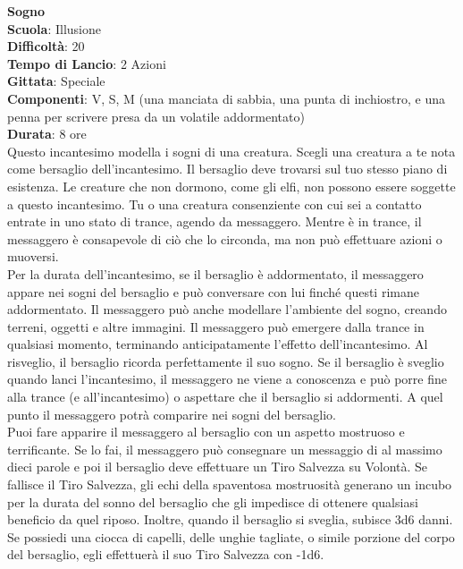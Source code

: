 \begin{multicols}{2}
\medskip\textbf{Sogno}\\
\textbf{Scuola}: Illusione\\
\textbf{Difficoltà}:  20\\
\textbf{Tempo di Lancio}: 2 Azioni\\
\textbf{Gittata}: Speciale\\
\textbf{Componenti}: V, S, M (una manciata di sabbia, una punta di inchiostro, e una penna per scrivere presa da un volatile addormentato)\\
\textbf{Durata}: 8 ore\\
Questo incantesimo modella i sogni di una creatura. Scegli una creatura a te nota come bersaglio dell'incantesimo. Il bersaglio deve trovarsi sul tuo stesso piano di esistenza. Le creature che non dormono, come gli elfi, non possono essere soggette a questo incantesimo. Tu o una creatura consenziente con cui sei a contatto entrate in uno stato di trance, agendo da messaggero. Mentre è in trance, il messaggero è consapevole di ciò che lo circonda, ma non può effettuare azioni o muoversi.\\
Per la durata dell'incantesimo, se il bersaglio è addormentato, il messaggero appare nei sogni del bersaglio e può conversare con lui finché questi rimane addormentato. Il messaggero può anche modellare l’ambiente del sogno, creando terreni, oggetti e altre immagini. Il messaggero può emergere dalla trance in qualsiasi momento, terminando anticipatamente l’effetto dell'incantesimo. Al risveglio, il bersaglio ricorda perfettamente il suo sogno. Se il bersaglio è sveglio quando lanci l'incantesimo, il messaggero ne viene a conoscenza e può porre fine alla trance (e all'incantesimo) o aspettare che il bersaglio si addormenti. A quel punto il messaggero potrà comparire nei sogni del bersaglio.\\
Puoi fare apparire il messaggero al bersaglio con un aspetto mostruoso e terrificante. Se lo fai, il messaggero può consegnare un messaggio di al massimo dieci parole e poi il bersaglio deve effettuare un Tiro Salvezza su Volontà. Se fallisce il Tiro Salvezza, gli echi della spaventosa mostruosità generano un incubo per la durata del sonno del bersaglio che gli impedisce di ottenere qualsiasi beneficio da quel riposo. Inoltre, quando il bersaglio si sveglia, subisce 3d6 danni.\\
Se possiedi una ciocca di capelli, delle unghie tagliate, o simile porzione del corpo del bersaglio, egli effettuerà il suo Tiro Salvezza con -1d6.


\end{multicols}
